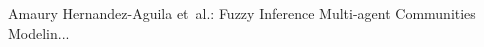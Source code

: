 \documentclass[12pt,journal,draftcls,onecolumn]{IEEEtran}
\begin{document}
%
{Amaury Hernandez-Aguila {et~al.}: Fuzzy Inference Multi-agent Communities Modelin...}
% 









\IEEEcompsoctitleabstractindextext{%



\begin{IEEEkeywords}
\end{IEEEkeywords}}
\end{document}
